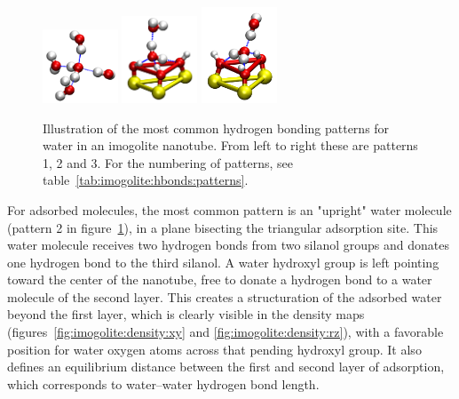 \documentclass[thesis]{subfiles}
\begin{document}
\begin{figure}[ht]
    \centering
    \includegraphics[width=0.2\textwidth]{figures/images/imogolite-hbonds-pattern-1}
    \includegraphics[width=0.2\textwidth]{figures/images/imogolite-hbonds-pattern-2}
    \includegraphics[width=0.2\textwidth]{figures/images/imogolite-hbonds-pattern-3}
    \caption{Illustration of the most common hydrogen bonding patterns for water
    in an imogolite nanotube. From left to right these are patterns 1, 2 and 3.
    For the numbering of patterns, see table~\ref{tab:imogolite:hbonds:patterns}.}
    \label{fig:imogolite:hbonds:patterns}
\end{figure}


For adsorbed molecules, the most common pattern is an "upright" water molecule
(pattern 2 in figure~\ref{fig:imogolite:hbonds:patterns}), in a plane bisecting
the triangular adsorption site. This water molecule receives two hydrogen bonds
from two silanol groups and donates one hydrogen bond to the third silanol. A
water hydroxyl group is left pointing toward the center of the nanotube, free to
donate a hydrogen bond to a water molecule of the second layer. This creates a
structuration of the adsorbed water beyond the first layer, which is clearly
visible in the density maps (figures~\ref{fig:imogolite:density:xy} and
\ref{fig:imogolite:density:rz}), with a favorable position for water oxygen
atoms across that pending hydroxyl group. It also defines an equilibrium
distance between the first and second layer of adsorption, which corresponds to
water--water hydrogen bond length.
\end{document}
